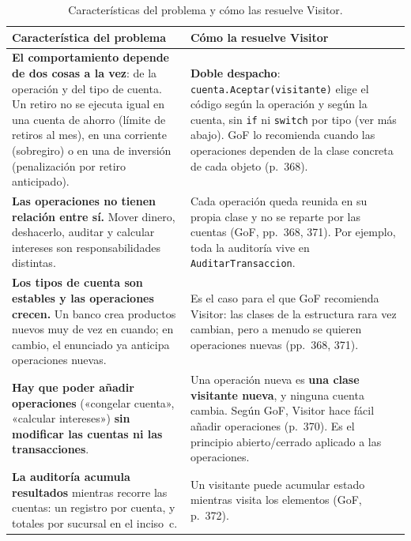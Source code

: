 \begin{table}[H]
\centering
\small
\begin{tabularx}{\textwidth}{>{\raggedright\arraybackslash}X >{\raggedright\arraybackslash}X}
\toprule
\textbf{Característica del problema} & \textbf{Cómo la resuelve Visitor} \\
\midrule
\textbf{El comportamiento depende de dos cosas a la vez}: de la operación y del tipo de
cuenta. Un retiro no se ejecuta igual en una cuenta de ahorro (límite de retiros al mes), en
una corriente (sobregiro) o en una de inversión (penalización por retiro anticipado).
  & \textbf{Doble despacho}: \texttt{cuenta.Aceptar(visitante)} elige el código según la
    operación y según la cuenta, sin \texttt{if} ni \texttt{switch} por tipo (ver más
    abajo). GoF lo recomienda cuando las operaciones dependen de la clase concreta de cada
    objeto (p.~368). \\
\addlinespace
\textbf{Las operaciones no tienen relación entre sí.} Mover dinero, deshacerlo, auditar y
calcular intereses son responsabilidades distintas.
  & Cada operación queda reunida en su propia clase y no se reparte por las cuentas
    (GoF, pp.~368, 371). Por ejemplo, toda la auditoría vive en
    \texttt{AuditarTransaccion}. \\
\addlinespace
\textbf{Los tipos de cuenta son estables y las operaciones crecen.} Un banco crea productos
nuevos muy de vez en cuando; en cambio, el enunciado ya anticipa operaciones nuevas.
  & Es el caso para el que GoF recomienda Visitor: las clases de la estructura rara vez
    cambian, pero a menudo se quieren operaciones nuevas (pp.~368, 371). \\
\addlinespace
\textbf{Hay que poder añadir operaciones} («congelar cuenta», «calcular intereses»)
\textbf{sin modificar las cuentas ni las transacciones}.
  & Una operación nueva es \textbf{una clase visitante nueva}, y ninguna cuenta cambia. Según
    GoF, Visitor hace fácil añadir operaciones (p.~370). Es el principio abierto/cerrado
    aplicado a las operaciones. \\
\addlinespace
\textbf{La auditoría acumula resultados} mientras recorre las cuentas: un registro por
cuenta, y totales por sucursal en el inciso~c.
  & Un visitante puede acumular estado mientras visita los elementos (GoF, p.~372). \\
\bottomrule
\end{tabularx}
\caption{Características del problema y cómo las resuelve Visitor.}
\end{table}

